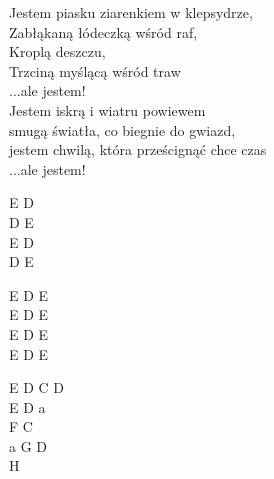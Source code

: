 \begin{text}
\begin{scriptTwelve}
    \vin Jestem piasku ziarenkiem w klepsydrze,\\
    \vin Zabłąkaną łódeczką wśród raf,\\
    \vin Kroplą deszczu,\\
    \vin Trzciną myślącą wśród traw\\
    \vin ...ale jestem!\\
    \vin Jestem iskrą i wiatru powiewem\\
    \vin smugą światła, co biegnie do gwiazd,\\
    \vin jestem chwilą, która prześcignąć chce czas\\
    \vin ...ale jestem!
\end{scriptTwelve}
\end{text}
\begin{chord}
\begin{scriptTwelve}
E D\\
D E\\
E D\\
D E

E D E\\
E D E\\
E D E\\
E D E

E D C D\\
E D a\\
F C\\
a G D\\
H
\end{scriptTwelve}
\end{chord}